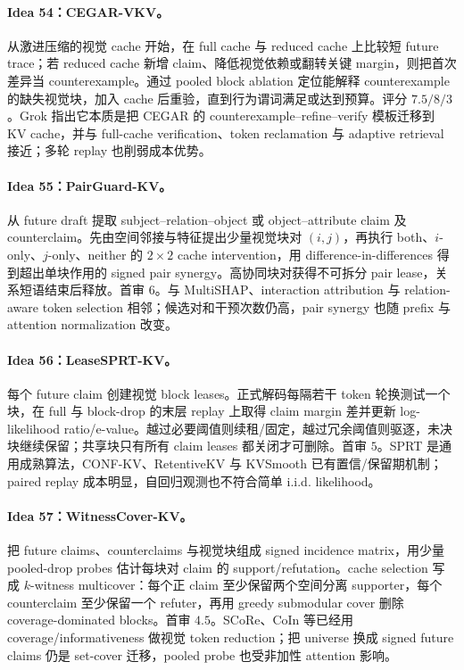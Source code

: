 \documentclass[UTF8,zihao=-4,a4paper]{ctexart}
\begin{document}
\paragraph{Idea 54：CEGAR-VKV。}
从激进压缩的视觉 cache 开始，在 full cache 与 reduced cache 上比较短 future trace；若 reduced cache 新增 claim、降低视觉依赖或翻转关键 margin，则把首次差异当 counterexample。通过 pooled block ablation 定位能解释 counterexample 的缺失视觉块，加入 cache 后重验，直到行为谓词满足或达到预算。评分 $7.5/8/3$。Grok 指出它本质是把 CEGAR 的 counterexample--refine--verify 模板迁移到 KV cache，并与 full-cache verification、token reclamation 与 adaptive retrieval 接近；多轮 replay 也削弱成本优势。

\paragraph{Idea 55：PairGuard-KV。}
从 future draft 提取 subject--relation--object 或 object--attribute claim 及 counterclaim。先由空间邻接与特征提出少量视觉块对 $(i,j)$，再执行 both、$i$-only、$j$-only、neither 的 $2\times2$ cache intervention，用 difference-in-differences 得到超出单块作用的 signed pair synergy。高协同块对获得不可拆分 pair lease，关系短语结束后释放。首审 $6$。与 MultiSHAP、interaction attribution 与 relation-aware token selection 相邻；候选对和干预次数仍高，pair synergy 也随 prefix 与 attention normalization 改变。

\paragraph{Idea 56：LeaseSPRT-KV。}
每个 future claim 创建视觉 block leases。正式解码每隔若干 token 轮换测试一个块，在 full 与 block-drop 的末层 replay 上取得 claim margin 差并更新 log-likelihood ratio/e-value。越过必要阈值则续租/固定，越过冗余阈值则驱逐，未决块继续保留；共享块只有所有 claim leases 都关闭才可删除。首审 $5$。SPRT 是通用成熟算法，CONF-KV、RetentiveKV 与 KVSmooth 已有置信/保留期机制；paired replay 成本明显，自回归观测也不符合简单 i.i.d. likelihood。

\paragraph{Idea 57：WitnessCover-KV。}
把 future claims、counterclaims 与视觉块组成 signed incidence matrix，用少量 pooled-drop probes 估计每块对 claim 的 support/refutation。cache selection 写成 $k$-witness multicover：每个正 claim 至少保留两个空间分离 supporter，每个 counterclaim 至少保留一个 refuter，再用 greedy submodular cover 删除 coverage-dominated blocks。首审 $4.5$。SCoRe、CoIn 等已经用 coverage/informativeness 做视觉 token reduction；把 universe 换成 signed future claims 仍是 set-cover 迁移，pooled probe 也受非加性 attention 影响。
\end{document}
